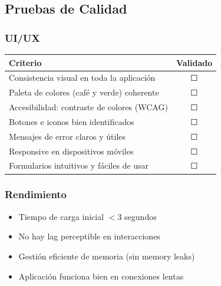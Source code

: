 \documentclass[12pt,a4paper]{report}
\begin{document}
\subsection{Pruebas de Calidad}

\subsubsection{UI/UX}
\begin{table}[h]
    \centering
    \begin{tabular}{|l|c|}
        \hline
        \textbf{Criterio} & \textbf{Validado} \\
        \hline
        Consistencia visual en toda la aplicación & ☐ \\
        \hline
        Paleta de colores (café y verde) coherente & ☐ \\
        \hline
        Accesibilidad: contraste de colores (WCAG) & ☐ \\
        \hline
        Botones e iconos bien identificados & ☐ \\
        \hline
        Mensajes de error claros y útiles & ☐ \\
        \hline
        Responsive en dispositivos móviles & ☐ \\
        \hline
        Formularios intuitivos y fáciles de usar & ☐ \\
        \hline
    \end{tabular}
\end{table}

\subsubsection{Rendimiento}
\begin{itemize}
    \item Tiempo de carga inicial $< 3$ segundos
    \item No hay lag perceptible en interacciones
    \item Gestión eficiente de memoria (sin memory leaks)
    \item Aplicación funciona bien en conexiones lentas
\end{itemize}
\end{document}
